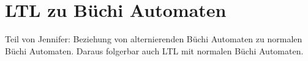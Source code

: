 \section{LTL zu Büchi Automaten}

Teil von Jennifer: Beziehung von alternierenden Büchi Automaten zu normalen Büchi Automaten. Daraus folgerbar auch LTL mit normalen Büchi Automaten.